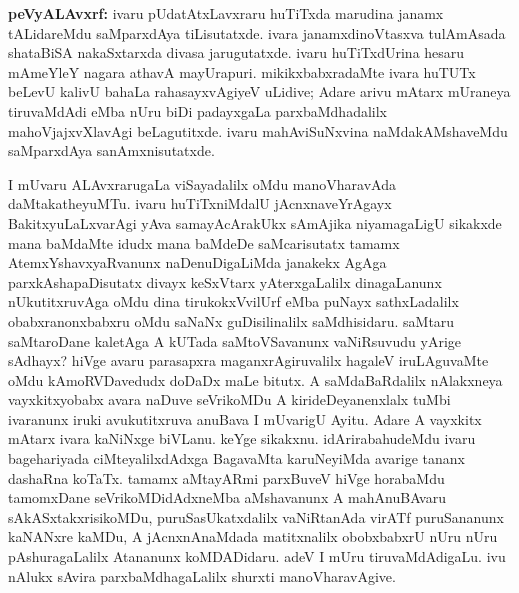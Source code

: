{\large\textbf{peVyALAvxrf:}} ivaru pUdatAtxLavxraru huTiTxda marudina janamx tALidareMdu saMparxdAya tiLisutatxde. ivara janamxdinoVtasxva tulAmAsada shataBiSA nakaSxtarxda divasa jarugutatxde. ivaru huTiTxdUrina hesaru mAmeYleY nagara athavA mayUrapuri. mikikxbabxradaMte ivara huTUTx beLevU kalivU bahaLa rahasayxvAgiyeV uLidive; Adare arivu mAtarx mUraneya tiruvaMdAdi eMba nUru biDi padayxgaLa parxbaMdhadalilx mahoVjajxvXlavAgi beLagutitxde. ivaru mahAviSuNxvina naMdakAMshaveMdu saMparxdAya sanAmxnisutatxde.

I mUvaru ALAvxrarugaLa viSayadalilx oMdu manoVharavAda daMtakatheyuMTu. ivaru huTiTxniMdalU jAcnxnaveYrAgayx BakitxyuLaLxvarAgi yAva samayAcArakUkx sAmAjika niyamagaLigU sikakxde mana baMdaMte idudx mana baMdeDe saMcarisutatx tamamx AtemxYshavxyaRvanunx naDenuDigaLiMda janakekx AgAga parxkAshapaDisutatx divayx keSxVtarx yAterxgaLalilx dina\-gaLanunx nUkutitxruvAga oMdu dina tirukokxVvilUrf eMba puNayx sathxLadalilx obabxra\-nonxbabxru oMdu saNaNx guDisilinalilx saMdhisidaru. saMtaru saMtaroDane kaletAga A kUTada saMtoVSavanunx vaNiRsuvudu yArige sAdhayx? hiVge avaru parasapxra maganx\-rAgiruvalilx hagaleV iruLAguvaMte oMdu kAmoRVDavedudx doDaDx maLe bitutx. A saMdaBaRdalilx nAlakxneya vayxkitxyobabx avara naDuve seVrikoMDu A kirideDeyanenxlalx tuMbi ivaranunx iruki avukutitxruva anuBava I mUvarigU Ayitu. Adare A vayxkitx mAtarx ivara kaNiNxge biVLanu. keYge sikakxnu. idArirabahudeMdu ivaru bage\-hariyada ciMteyalilxdAdxga BagavaMta karuNeyiMda avarige tananx dashaRna koTaTx. tamamx aMta\-yARmi parxBuveV hiVge horabaMdu tamomxDane seVrikoMDidAdxneMba aMshavanunx A mahAnuBAvaru sAkASxtakxrisikoMDu, puruSasUkatxdalilx vaNiRtanAda virATf puruSa\-nanunx kaNANxre kaMDu, A jAcnxnAnaMdada matitxnalilx obobxbabxrU nUru nUru pAshura\-gaLalilx Atananunx koMDADidaru. adeV I mUru tiruvaMdAdigaLu. ivu nAlukx sAvira parxbaMdhagaLalilx shurxti manoVharavAgive.

